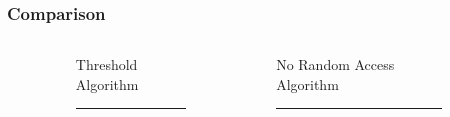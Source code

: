 \documentclass{presentation}
\begin{document}
\begin{frame}
  \frametitle{Comparison}

  \vspace{-1cm}
  \begin{columns}[t]
    \begin{column}{0.02\textwidth}\end{column}
    \begin{column}[t]{0.45\textwidth}
      \begin{center}
        \Large
        Threshold\\Algorithm
        \vspace{0.1cm} \hrule
      \end{center}

      \large
      \begin{itemize}
        \vspace{0.3cm}
        \vspace{0.3cm}
      \end{itemize}
    \end{column}
    \begin{column}{0.06\textwidth}\end{column}
    \begin{column}[t]{0.45\textwidth}
      \begin{center}
        \Large
        No Random Access\\Algorithm
        \vspace{0,1cm} \hrule
      \end{center}

      \large
      \begin{itemize}
      \end{itemize}
    \end{column}
    \begin{column}{0.02\textwidth}\end{column}
  \end{columns}
\end{frame}
\end{document}

